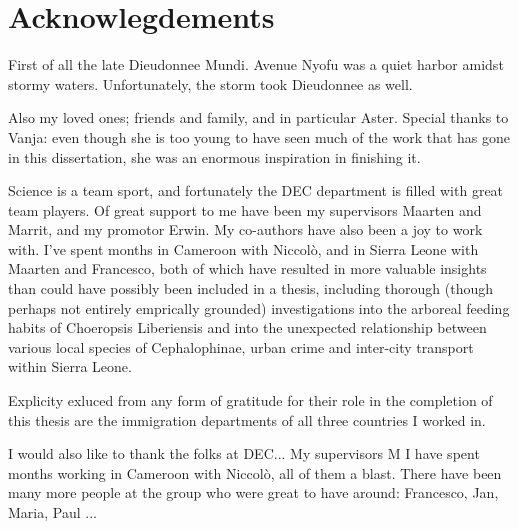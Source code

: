 \chapter*{Acknowlegdements}
First of all the late Dieudonnee Mundi. Avenue Nyofu was a quiet harbor amidst stormy waters. Unfortunately, the storm took Dieudonnee as well.


Also my loved ones; friends and family, and in particular Aster. Special thanks to Vanja: even though she is too young to have seen much of the work that has gone in this dissertation, she was an enormous inspiration in finishing it.



Science is a team sport, and fortunately the DEC department is filled with great team players. Of great support to me have been my supervisors Maarten and Marrit, and my promotor Erwin. My co-authors have also been a joy to work with. I've spent months in Cameroon with Niccolò, and in Sierra Leone with Maarten and Francesco, both of which have resulted in more valuable insights than could have possibly been included in a thesis, including thorough (though perhaps not entirely emprically grounded) investigations into the arboreal feeding habits of Choeropsis Liberiensis and into the unexpected relationship between various local species of Cephalophinae, urban crime and inter-city transport within Sierra Leone. 


Explicity exluced from any form of gratitude for their role in the completion of this thesis are the immigration departments of all three countries I worked in.

I would also like to thank the folks at DEC... My supervisors M I have spent months working in Cameroon with Niccolò, all of them a blast. There have been many more people at the group who were great to have around: Francesco, Jan, Maria, Paul ...





